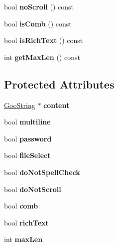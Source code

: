 \begin{DoxyCompactItemize}
bool {\bfseries no\+Scroll} () const
\item 
\mbox{\label{class_form_field_text_ad9ab0e63227e96399967af45f54b3fc9}} 
bool {\bfseries is\+Comb} () const
\item 
\mbox{\label{class_form_field_text_a3c23b3b6cd48d3ac99e1ed5cf75ad314}} 
bool {\bfseries is\+Rich\+Text} () const
\item 
\mbox{\label{class_form_field_text_a6712c37efad9333d117bcf97bd50e909}} 
int {\bfseries get\+Max\+Len} () const
\end{DoxyCompactItemize}
\subsection*{Protected Attributes}
\begin{DoxyCompactItemize}
\item 
\mbox{\label{class_form_field_text_ad72461dd3f98e3ef6f63ca1e7bd7724f}} 
\hyperlink{class_goo_string}{Goo\+String} $\ast$ {\bfseries content}
\item 
\mbox{\label{class_form_field_text_af593d710ccb74410ecc2649b25d02cff}} 
bool {\bfseries multiline}
\item 
\mbox{\label{class_form_field_text_a621213d14bddcd38bade8b747b5abd17}} 
bool {\bfseries password}
\item 
\mbox{\label{class_form_field_text_ae4a8954e46bc787afb3f4594af5f7b06}} 
bool {\bfseries file\+Select}
\item 
\mbox{\label{class_form_field_text_a4166daa121fbf4b50679fc6e831e1ff6}} 
bool {\bfseries do\+Not\+Spell\+Check}
\item 
\mbox{\label{class_form_field_text_a71f167c2d33d7bbeb330d255bfbce03c}} 
bool {\bfseries do\+Not\+Scroll}
\item 
\mbox{\label{class_form_field_text_ae514dc9a2ec8b016612aa9f4a7be0653}} 
bool {\bfseries comb}
\item 
\mbox{\label{class_form_field_text_a6cc1398991e1fa617899fddf93d18826}} 
bool {\bfseries rich\+Text}
\item 
\mbox{\label{class_form_field_text_a45779d5a74eac47db42636d2f28d4608}} 
int {\bfseries max\+Len}
\end{DoxyCompactItemize}
